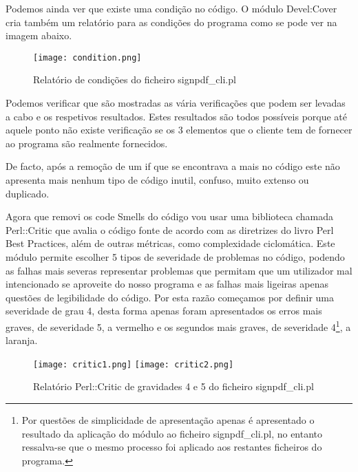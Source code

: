 \par Podemos ainda ver que existe uma condição no código. O módulo Devel:Cover cria também um relatório para as condições do programa como se pode ver na imagem abaixo.

\begin{figure}[H]

  \centering
  \captionsetup{justification=centering}

  \texttt{[image: condition.png]}
  
  \caption {Relatório de condições do ficheiro signpdf\_cli.pl}

\end{figure}

Podemos verificar que são mostradas as vária verificações que podem ser levadas a cabo e os respetivos resultados. Estes resultados são todos possíveis porque até aquele ponto não existe verificação se os 3 elementos que o cliente tem de fornecer ao programa são realmente fornecidos.
\par De facto, após a remoção de um if que se encontrava a mais no código este não apresenta mais nenhum tipo de código inutil, confuso, muito extenso ou duplicado.

\par Agora que removi os code Smells do código vou usar uma biblioteca chamada Perl::Critic que avalia o código fonte de acordo com as diretrizes do livro Perl Best Practices, além de outras métricas, como complexidade ciclomática. Este módulo permite escolher 5 tipos de severidade de problemas no código, podendo as falhas mais severas representar problemas que permitam que um utilizador mal intencionado se aproveite do nosso programa e as falhas mais ligeiras apenas questões de legibilidade do código. Por esta razão começamos por definir uma severidade de grau 4, desta forma apenas foram apresentados os erros mais graves, de severidade 5, a vermelho e os segundos mais graves, de severidade 4\footnote{Por questões de simplicidade de apresentação apenas é apresentado o resultado da aplicação do módulo ao ficheiro signpdf\_cli.pl, no entanto ressalva-se que o mesmo processo foi aplicado aos restantes ficheiros do programa.}, a laranja.

\begin{figure}[H]

  \centering
  \captionsetup{justification=centering}

  \texttt{[image: critic1.png]}
  \texttt{[image: critic2.png]}
  
  \caption {Relatório Perl::Critic de gravidades 4 e 5 do ficheiro signpdf\_cli.pl}

\end{figure}

